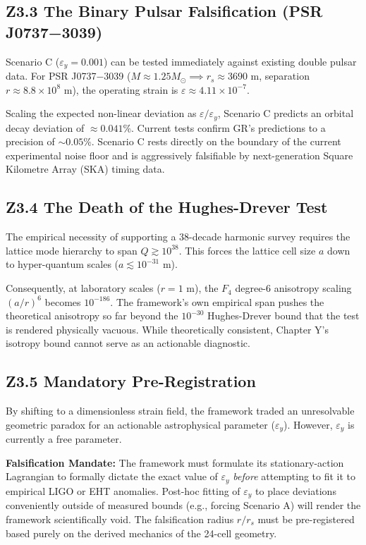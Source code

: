 \documentclass[11pt, letterpaper, openany]{book}
\begin{document}
\subsection*{Z3.3 The Binary Pulsar Falsification (PSR J0737−3039)}

Scenario C ($\varepsilon_y = 0.001$) can be tested immediately against existing double pulsar data. For PSR J0737−3039 ($M \approx 1.25 M_\odot \implies r_s \approx 3690$ m, separation $r \approx 8.8 \times 10^8$ m), the operating strain is $\varepsilon \approx 4.11 \times 10^{-7}$. 

Scaling the expected non-linear deviation as $\varepsilon / \varepsilon_y$, Scenario C predicts an orbital decay deviation of $\approx 0.041\%$. Current tests confirm GR's predictions to a precision of $\sim 0.05\%$. Scenario C rests directly on the boundary of the current experimental noise floor and is aggressively falsifiable by next-generation Square Kilometre Array (SKA) timing data.

\subsection*{Z3.4 The Death of the Hughes-Drever Test}

The empirical necessity of supporting a 38-decade harmonic survey requires the lattice mode hierarchy to span $Q \gtrsim 10^{38}$. This forces the lattice cell size $a$ down to hyper-quantum scales ($a \lesssim 10^{-31}$ m). 

Consequently, at laboratory scales ($r=1$ m), the $F_4$ degree-6 anisotropy scaling $(a/r)^6$ becomes $10^{-186}$. The framework's own empirical span pushes the theoretical anisotropy so far beyond the $10^{-30}$ Hughes-Drever bound that the test is rendered physically vacuous. While theoretically consistent, Chapter Y's isotropy bound cannot serve as an actionable diagnostic.

\subsection*{Z3.5 Mandatory Pre-Registration}

By shifting to a dimensionless strain field, the framework traded an unresolvable geometric paradox for an actionable astrophysical parameter ($\varepsilon_y$). However, $\varepsilon_y$ is currently a free parameter.

\textbf{Falsification Mandate:} The framework must formulate its stationary-action Lagrangian to formally dictate the exact value of $\varepsilon_y$ \textit{before} attempting to fit it to empirical LIGO or EHT anomalies. Post-hoc fitting of $\varepsilon_y$ to place deviations conveniently outside of measured bounds (e.g., forcing Scenario A) will render the framework scientifically void. The falsification radius $r/r_s$ must be pre-registered based purely on the derived mechanics of the 24-cell geometry.
\end{document}
